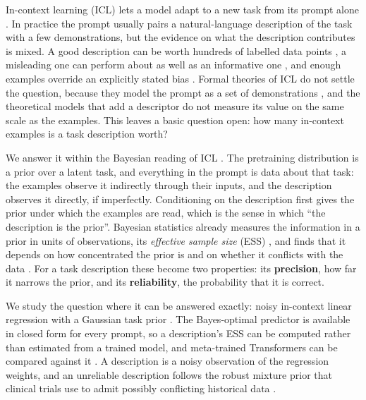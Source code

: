 \documentclass[10pt]{article}
\begin{document}
In-context learning (ICL) lets a model adapt to a new task from its prompt alone \citep{brown2020}. In practice the prompt usually pairs a natural-language description of the task with a few demonstrations, but the evidence on what the description contributes is mixed. A good description can be worth hundreds of labelled data points \citep{lescao2021, honda2025}, a misleading one can perform about as well as an informative one \citep{webson2022}, and enough examples override an explicitly stated bias \citep{gupta2025}. Formal theories of ICL do not settle the question, because they model the prompt as a set of demonstrations \citep{garg2022, akyurek2023, xie2022}, and the theoretical models that add a descriptor \citep{huangge2025, lin2025, tong2026} do not measure its value on the same scale as the examples. This leaves a basic question open: how many in-context examples is a task description worth?

We answer it within the Bayesian reading of ICL \citep{xie2022}. The pretraining distribution is a prior over a latent task, and everything in the prompt is data about that task: the examples observe it indirectly through their inputs, and the description observes it directly, if imperfectly. Conditioning on the description first gives the prior under which the examples are read, which is the sense in which ``the description is the prior''. Bayesian statistics already measures the information in a prior in units of observations, its \emph{effective sample size} (ESS) \citep{morita2008}, and finds that it depends on how concentrated the prior is and on whether it conflicts with the data \citep{evans2006}. For a task description these become two properties: its \textbf{precision}, how far it narrows the prior, and its \textbf{reliability}, the probability that it is correct.

We study the question where it can be answered exactly: noisy in-context linear regression with a Gaussian task prior \citep{garg2022, akyurek2023, raventos2023}. The Bayes-optimal predictor is available in closed form for every prompt, so a description's ESS can be computed rather than estimated from a trained model, and meta-trained Transformers can be compared against it \citep{genewein2025}. A description is a noisy observation of the regression weights, and an unreliable description follows the robust mixture prior that clinical trials use to admit possibly conflicting historical data \citep{schmidli2014}.
\end{document}
